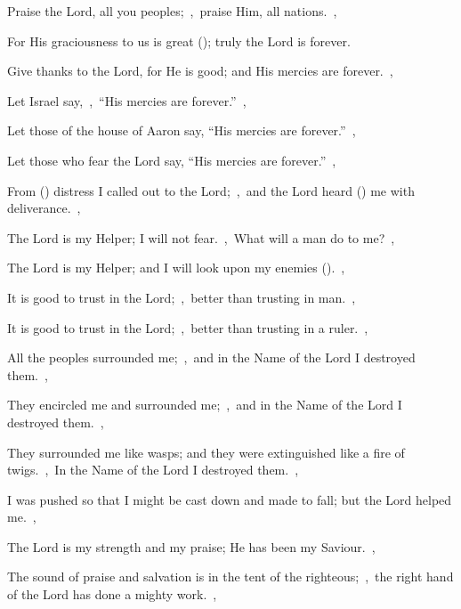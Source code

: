 \documentclass[12pt,twoside,a5paper]{article}
\begin{document}
\begin{normalparskip}
  Praise the Lord, all you peoples;~\sep\ praise Him, all nations.~\sep


  For His graciousness to us is great (); truly the Lord is forever.
\end{normalparskip}


\begin{normalparskip}
  Give thanks to the Lord, for He is good; and His mercies are forever.~\sep

  Let Israel say,~\sep\ ``His mercies are forever.''~\sep


  Let those of the house of Aaron say, ``His mercies are forever.''~\sep

  Let those who fear the Lord say, ``His mercies are forever.''~\sep

  From () distress I called out to the Lord;~\sep\ and the Lord heard () me with deliverance.~\sep

  The Lord is my Helper; I will not fear.~\sep\ What will a man do to me?~\sep

  The Lord is my Helper; and I will look upon my enemies ().~\sep

  It is good to trust in the Lord;~\sep\ better than trusting in man.~\sep

  It is good to trust in the Lord;~\sep\ better than trusting in a ruler.~\sep

  All the peoples surrounded me;~\sep\ and in the Name of the Lord I destroyed them.~\sep

  They encircled me and surrounded me;~\sep\ and in the Name of the Lord I destroyed them.~\sep

  They surrounded me like wasps; and they were extinguished like a fire of twigs.~\sep\ In the Name of the Lord I destroyed them.~\sep

  I was pushed so that I might be cast down and made to fall; but the Lord helped me.~\sep

  The Lord is my strength and my praise; He has been my Saviour.~\sep

  The sound of praise and salvation is in the tent of the righteous;~\sep\ the right hand of the Lord has done a mighty work.~\sep


\end{normalparskip}
\end{document}
